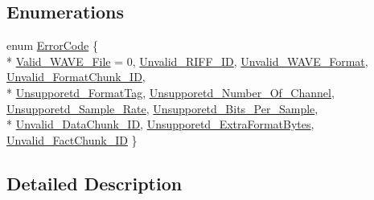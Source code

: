 \subsection*{Enumerations}
\begin{DoxyCompactItemize}
\item 
enum \hyperlink{group___w_a_v_e_p_l_a_y_e_r___private___defines_ga59e56af19e754a6aa26a612ebf91d05f}{Error\-Code} \{ \\*
\hyperlink{group___w_a_v_e_p_l_a_y_e_r___private___defines_gga59e56af19e754a6aa26a612ebf91d05fa1fabd873712e53cf11eb22b34ccb33e4}{Valid\-\_\-\-W\-A\-V\-E\-\_\-\-File} = 0, 
\hyperlink{group___w_a_v_e_p_l_a_y_e_r___private___defines_gga59e56af19e754a6aa26a612ebf91d05fad667e766ef27c3362677153089ddbe21}{Unvalid\-\_\-\-R\-I\-F\-F\-\_\-\-I\-D}, 
\hyperlink{group___w_a_v_e_p_l_a_y_e_r___private___defines_gga59e56af19e754a6aa26a612ebf91d05fa20c358c2802e18284ae87cc4e7df9f14}{Unvalid\-\_\-\-W\-A\-V\-E\-\_\-\-Format}, 
\hyperlink{group___w_a_v_e_p_l_a_y_e_r___private___defines_gga59e56af19e754a6aa26a612ebf91d05faac0f69147a76390f1da102e6cf220a60}{Unvalid\-\_\-\-Format\-Chunk\-\_\-\-I\-D}, 
\\*
\hyperlink{group___w_a_v_e_p_l_a_y_e_r___private___defines_gga59e56af19e754a6aa26a612ebf91d05fa5b51107e731ee731773f39d17598c84e}{Unsupporetd\-\_\-\-Format\-Tag}, 
\hyperlink{group___w_a_v_e_p_l_a_y_e_r___private___defines_gga59e56af19e754a6aa26a612ebf91d05fa1dfc5f21b062f80a3f2708938b36770b}{Unsupporetd\-\_\-\-Number\-\_\-\-Of\-\_\-\-Channel}, 
\hyperlink{group___w_a_v_e_p_l_a_y_e_r___private___defines_gga59e56af19e754a6aa26a612ebf91d05fa024dc78af1fa8d2db4361d40da325462}{Unsupporetd\-\_\-\-Sample\-\_\-\-Rate}, 
\hyperlink{group___w_a_v_e_p_l_a_y_e_r___private___defines_gga59e56af19e754a6aa26a612ebf91d05fac3a0a25a660be15d1eb6b8aa793735b1}{Unsupporetd\-\_\-\-Bits\-\_\-\-Per\-\_\-\-Sample}, 
\\*
\hyperlink{group___w_a_v_e_p_l_a_y_e_r___private___defines_gga59e56af19e754a6aa26a612ebf91d05faa4e11aeb87ed5450e21ca46356b812de}{Unvalid\-\_\-\-Data\-Chunk\-\_\-\-I\-D}, 
\hyperlink{group___w_a_v_e_p_l_a_y_e_r___private___defines_gga59e56af19e754a6aa26a612ebf91d05fa006514c8e831d8591a7df3b1ebe9a292}{Unsupporetd\-\_\-\-Extra\-Format\-Bytes}, 
\hyperlink{group___w_a_v_e_p_l_a_y_e_r___private___defines_gga59e56af19e754a6aa26a612ebf91d05fa61a139e96b76edecfa33c5c6ec113072}{Unvalid\-\_\-\-Fact\-Chunk\-\_\-\-I\-D}
 \}
\end{DoxyCompactItemize}


\subsection{Detailed Description}


